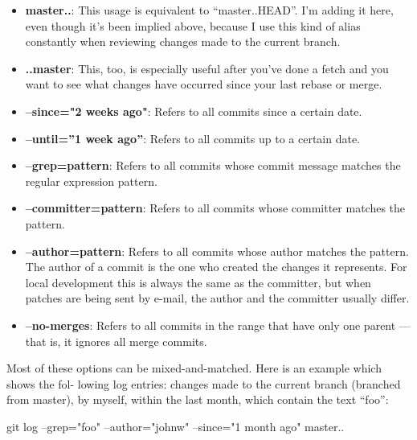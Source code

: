 \documentclass{report}
\begin{document}
\begin{itemize}
\begin{itemize}
                \item \textbf{master..}: This usage is equivalent to “master..HEAD”. I’m adding it here, even though it’s been implied above, because I use this kind of alias constantly when reviewing changes made to the current branch.
                \item \textbf{..master}: This, too, is especially useful after you’ve done a fetch and you want to see what changes have occurred since your last rebase or merge.
                \item \textbf{--since="2 weeks ago"}: Refers to all commits since a certain date.
                \item \textbf{--until=”1 week ago”}: Refers to all commits up to a certain date.
                \item \textbf{--grep=pattern}: Refers to all commits whose commit message matches the regular expression pattern.
                \item \textbf{--committer=pattern}: Refers to all commits whose committer matches the pattern.
                \item \textbf{--author=pattern}: Refers to all commits whose author matches the pattern. The author of a commit is the one who created the changes it represents. For local development this is always the same as the committer, but when patches are being sent by e-mail, the author and the committer usually differ.
                \item \textbf{--no-merges}: Refers to all commits in the range that have only one parent — that is, it ignores all merge commits.
            \end{itemize}
            Most of these options can be mixed-and-matched. Here is an example which shows the fol- lowing log entries: changes made to the current branch (branched from master), by myself, within the last month, which contain the text “foo”:
            \bigbreak \noindent 
            \begin{bashcode}
                git log --grep="foo" --author="johnw" --since="1 month ago" master..
            \end{bashcode}
    \end{itemize}
\end{document}
